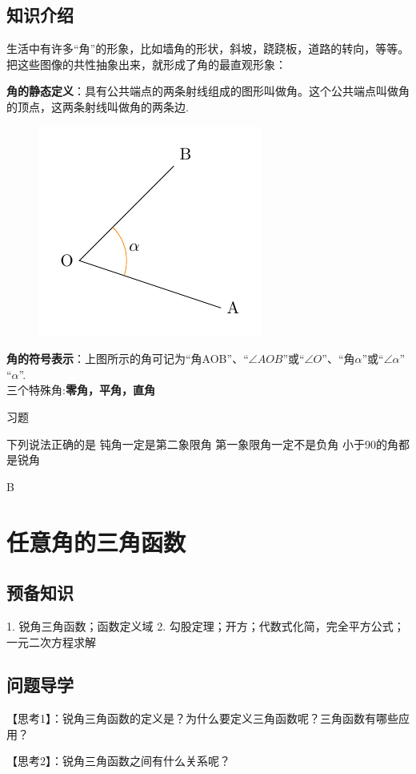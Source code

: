 \subsection{知识介绍}
生活中有许多“角”的形象，比如墙角的形状，斜坡，跷跷板，道路的转向，等等。把这些图像的共性抽象出来，就形成了角的最直观形象：\par
{\bf 角的静态定义}：具有公共端点的两条射线组成的图形叫做角。这个公共端点叫做角的顶点，这两条射线叫做角的两条边.\\
\begin{figure}[!htbp]
  \centering
  \includegraphics[scale=0.8]{Fig.ArbitraryAngle.pdf}
\end{figure}\par
{\bf 角的符号表示}：上图所示的角可记为“角AOB”、“$\angle{AOB}$”或“$\angle O$”、“角$\alpha$”或“$\angle\alpha$”
“$\alpha$”.\\
三个特殊角:{\bf\kaishu 零角，平角，直角}\par
\begin{exercise}{习题}
\item
下列说法正确的是\xz
{}
{钝角一定是第二象限角}
{第一象限角一定不是负角}
{小于90\textdegree 的角都是锐角}
\begin{answer}B\end{answer}
\end{exercise}

\section{任意角的三角函数}
\subsection{预备知识}
1. 锐角三角函数；函数定义域
2. 勾股定理；开方；代数式化简，完全平方公式；一元二次方程求解
\subsection{问题导学}
{\heiti 【思考1】}：锐角三角函数的定义是？为什么要定义三角函数呢？三角函数有哪些应用？\par
\vspace{12em}
{\heiti 【思考2】}：锐角三角函数之间有什么关系呢？\par
\vspace{12em}



\stoptexercise
